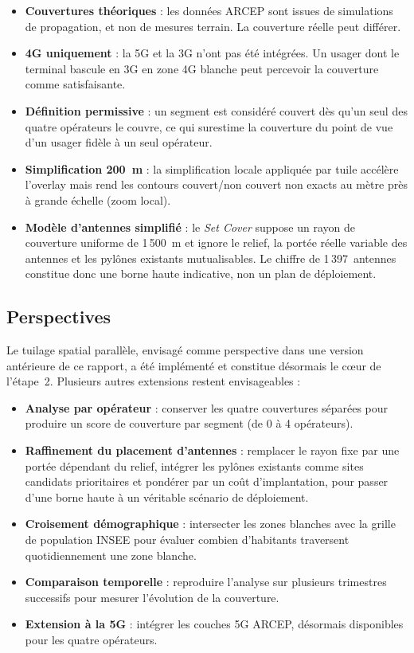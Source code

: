 \documentclass[11pt,a4paper]{article}
\begin{document}
\begin{itemize}
  \item \textbf{Couvertures théoriques} : les données ARCEP sont issues de simulations de propagation, et non de mesures terrain. La couverture réelle peut différer.
  \item \textbf{4G uniquement} : la 5G et la 3G n'ont pas été intégrées. Un usager dont le terminal bascule en 3G en zone 4G blanche peut percevoir la couverture comme satisfaisante.
  \item \textbf{Définition permissive} : un segment est considéré couvert dès qu'un seul des quatre opérateurs le couvre, ce qui surestime la couverture du point de vue d'un usager fidèle à un seul opérateur.
  \item \textbf{Simplification 200~m} : la simplification locale appliquée par tuile accélère l'overlay mais rend les contours couvert/non couvert non exacts au mètre près à grande échelle (zoom local).
  \item \textbf{Modèle d'antennes simplifié} : le \emph{Set Cover} suppose un rayon de couverture uniforme de 1\,500~m et ignore le relief, la portée réelle variable des antennes et les pylônes existants mutualisables. Le chiffre de 1\,397~antennes constitue donc une borne haute indicative, non un plan de déploiement.
\end{itemize}

\subsection{Perspectives}

Le tuilage spatial parallèle, envisagé comme perspective dans une version antérieure de ce rapport, a été implémenté et constitue désormais le cœur de l'étape~2. Plusieurs autres extensions restent envisageables :
\begin{itemize}
  \item \textbf{Analyse par opérateur} : conserver les quatre couvertures séparées pour produire un score de couverture par segment (de 0 à 4 opérateurs).
  \item \textbf{Raffinement du placement d'antennes} : remplacer le rayon fixe par une portée dépendant du relief, intégrer les pylônes existants comme sites candidats prioritaires et pondérer par un coût d'implantation, pour passer d'une borne haute à un véritable scénario de déploiement.
  \item \textbf{Croisement démographique} : intersecter les zones blanches avec la grille de population INSEE pour évaluer combien d'habitants traversent quotidiennement une zone blanche.
  \item \textbf{Comparaison temporelle} : reproduire l'analyse sur plusieurs trimestres successifs pour mesurer l'évolution de la couverture.
  \item \textbf{Extension à la 5G} : intégrer les couches 5G ARCEP, désormais disponibles pour les quatre opérateurs.
\end{itemize}
\end{document}
